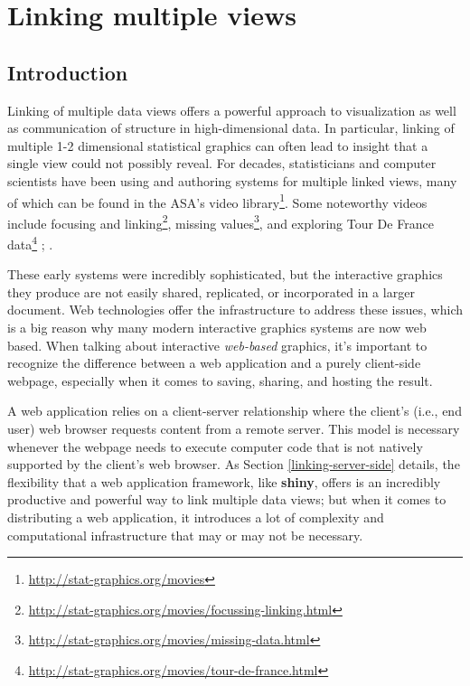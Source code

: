 \documentclass[
  12pt,
]{krantz}
\renewcommand{\href}[2]{#2\footnote{\url{#1}}}
\begin{document}
\hypertarget{part-linking-multiple-views}{%
\part{Linking multiple views}\label{part-linking-multiple-views}}

\hypertarget{introduction-2}{%
\chapter{Introduction}\label{introduction-2}}

Linking of multiple data views offers a powerful approach to visualization as well as communication of structure in high-dimensional data. In particular, linking of multiple 1-2 dimensional statistical graphics can often lead to insight that a single view could not possibly reveal. For decades, statisticians and computer scientists have been using and authoring systems for multiple linked views, many of which can be found in the \href{http://stat-graphics.org/movies}{ASA's video library}. Some noteworthy videos include \href{http://stat-graphics.org/movies/focussing-linking.html}{focusing and linking}, \href{http://stat-graphics.org/movies/missing-data.html}{missing values}, and \href{http://stat-graphics.org/movies/tour-de-france.html}{exploring Tour De France data} \citep{xgobi}; \citep{mondrianbook}.

These early systems were incredibly sophisticated, but the interactive graphics they produce are not easily shared, replicated, or incorporated in a larger document. Web technologies offer the infrastructure to address these issues, which is a big reason why many modern interactive graphics systems are now web based. When talking about interactive \emph{web-based} graphics, it's important to recognize the difference between a web application and a purely client-side webpage, especially when it comes to saving, sharing, and hosting the result.

A web application relies on a client-server relationship where the client's (i.e., end user) web browser requests content from a remote server. This model is necessary whenever the webpage needs to execute computer code that is not natively supported by the client's web browser. As Section \ref{linking-server-side} details, the flexibility that a web application framework, like \textbf{shiny}, offers is an incredibly productive and powerful way to link multiple data views; but when it comes to distributing a web application, it introduces a lot of complexity and computational infrastructure that may or may not be necessary.
\end{document}
